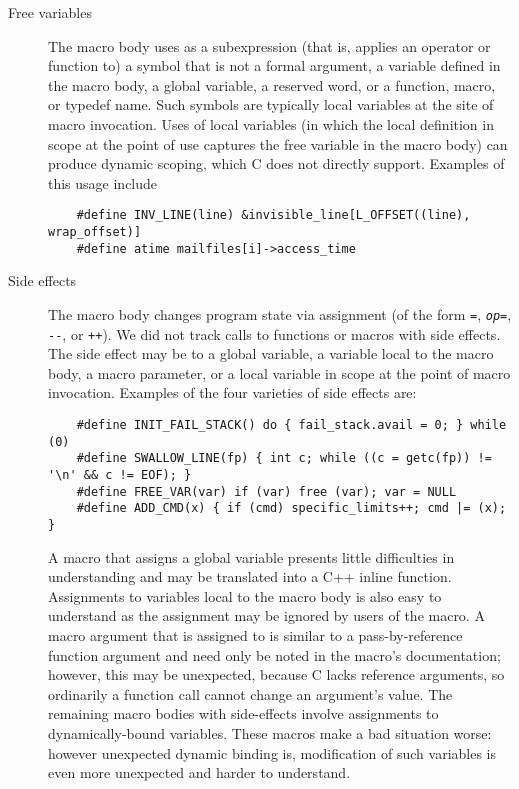 \documentclass[10pt]{article}
\begin{document}
\begin{description}
\item[Free variables]\label{page:freevar}
  The macro body uses as a subexpression (that is, applies an operator or
  function to) a symbol that is not a formal argument, a variable defined
  in the macro body, a global variable, a reserved word, or a function, macro, or typedef
  name.  Such symbols are typically local variables at the site of
  macro invocation.  Uses of local variables (in which the local definition
  in scope at the point of use captures the free variable in the macro
  body) can produce dynamic scoping, which C does not directly support.
  Examples of this usage include
\begin{verbatim}
    #define INV_LINE(line) &invisible_line[L_OFFSET((line), wrap_offset)]
    #define atime mailfiles[i]->access_time
\end{verbatim}

\item[Side effects]
  The macro body changes program state via assignment (of the form {\tt =},
  {\tt {\em op}=}, {\tt -{}-}, or {\tt ++}).  We did not track calls to
  functions or macros with side effects.  The side effect may be to a
  global variable, a variable local to the macro body, a macro parameter,
  or a local variable in scope at the point of macro invocation.
  Examples of the four varieties of side effects are:
\begin{verbatim}
    #define INIT_FAIL_STACK() do { fail_stack.avail = 0; } while (0)
    #define SWALLOW_LINE(fp) { int c; while ((c = getc(fp)) != '\n' && c != EOF); }
    #define FREE_VAR(var) if (var) free (var); var = NULL
    #define ADD_CMD(x) { if (cmd) specific_limits++; cmd |= (x); }
\end{verbatim}

  A macro that assigns a global variable presents little difficulties in
  understanding and may be translated into a C++ inline function.
  Assignments to variables local to the macro body is also easy to understand
  as the assignment may be ignored by users
  of the macro.  A macro argument that is assigned to is similar to a
  pass-by-reference function argument and need only be noted in the macro's
  documentation; however, this may be unexpected, because C lacks reference
  arguments, so ordinarily a function call cannot change an argument's
  value.  The remaining macro bodies with side-effects involve assignments
  to dynamically-bound variables.  These macros make a bad situation worse: however
  unexpected dynamic binding is, modification of such variables is even
  more unexpected and harder to understand.
  


\end{description}
\end{document}
